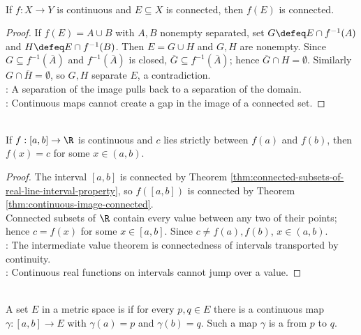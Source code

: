 \begin{theorem} \label{thm:continuous-image-connected} \\
If $f:X\to Y$ is continuous and $E\subseteq X$ is connected, then $f(E)$ is connected.
\begin{proof}
If $f(E)=A\cup B$ with $A,B$ nonempty separated, set $G\defeq E\cap f^{-1}(A)$ and $H\defeq E\cap f^{-1}(B)$. Then $E=G\cup H$ and $G,H$ are nonempty. Since $G\subseteq f^{-1}(\overline{A})$ and $f^{-1}(\overline{A})$ is closed, $\overline{G}\subseteq f^{-1}(\overline{A})$; hence $\overline{G}\cap H=\emptyset$. Similarly $G\cap\overline{H}=\emptyset$, so $G,H$ separate $E$, a contradiction.\\
: A separation of the image pulls back to a separation of the domain.\\
: Continuous maps cannot create a gap in the image of a connected set.
\end{proof}
\end{theorem}

\begin{theorem} \label{thm:intermediate-value-theorem} \\
If $f:[a,b]\to\R$ is continuous and $c$ lies strictly between $f(a)$ and $f(b)$, then $f(x)=c$ for some $x\in(a,b)$.
\begin{proof}
The interval $[a,b]$ is connected by Theorem \ref{thm:connected-subsets-of-real-line-interval-property}, so $f([a,b])$ is connected by Theorem \ref{thm:continuous-image-connected}.\\
Connected subsets of $\R$ contain every value between any two of their points; hence $c=f(x)$ for some $x\in[a,b]$. Since $c\neq f(a),f(b)$, $x\in(a,b)$.\\
: The intermediate value theorem is connectedness of intervals transported by continuity.\\
: Continuous real functions on intervals cannot jump over a value.
\end{proof}
\end{theorem}

\begin{definition} \label{def:path-connected-set} \\
A set $E$ in a metric space is  if for every $p,q\in E$ there is a continuous map $\gamma:[a,b]\to E$ with $\gamma(a)=p$ and $\gamma(b)=q$. Such a map $\gamma$ is a  from $p$ to $q$.
\end{definition}

